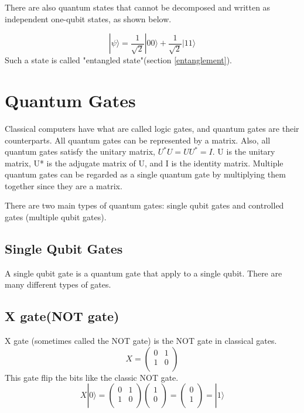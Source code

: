 There are also quantum states that cannot be decomposed and written as independent one-qubit states, as shown below. 

\begin{equation}
    |\psi\rangle = \frac{1}{\sqrt{2}} |00\rangle + \frac{1}{\sqrt{2}} |11\rangle
\end{equation}
Such a state is called "entangled state"(section \ref{entanglement}).

\section{Quantum Gates}
Classical computers have what are called logic gates, and quantum gates are their counterparts.
All quantum gates can be represented by a matrix.
Also, all quantum gates satisfy the unitary matrix, $U^*U = UU^* = I$.
U is the unitary matrix, U* is the adjugate matrix of U, and I is the identity matrix.
Multiple quantum gates can be regarded as a single quantum gate by multiplying them together since they are a matrix.

There are two main types of quantum gates: single qubit gates and controlled gates (multiple qubit gates).

\subsection{Single Qubit Gates}
A single qubit gate is a quantum gate that apply to a single qubit\cite{qgate}.
There are many different types of gates.
\subsection*{X gate(NOT gate)}
X gate (sometimes called the NOT gate) is the NOT gate in classical gates.
\begin{equation}
    X =
    \begin{pmatrix}
        0 & 1\\
        1 & 0\\
    \end{pmatrix}
\end{equation}
This gate flip the bits like the classic NOT gate.
\begin{equation}
    X |0\rangle =
    \begin{pmatrix}
        0 & 1\\
        1 & 0\\
    \end{pmatrix}
    \begin{pmatrix}
        1 \\
        0 \\
    \end{pmatrix} = 
    \begin{pmatrix}
        0 \\
        1 \\
    \end{pmatrix} = |1\rangle
\end{equation}


